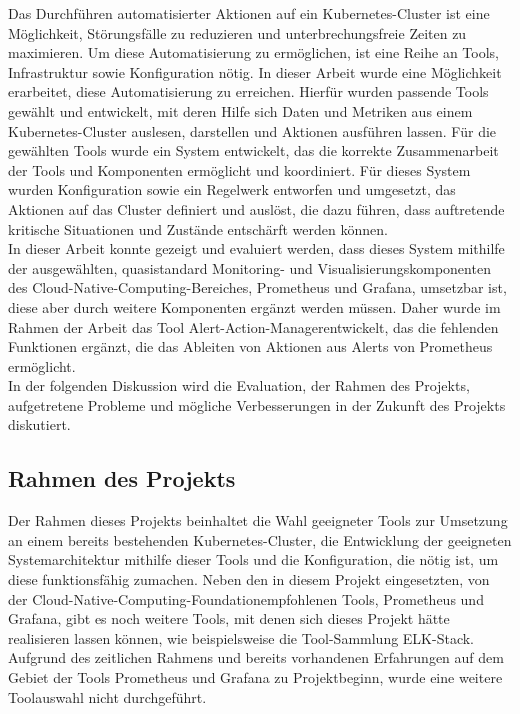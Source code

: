 \documentclass[a4paper,10pt]{scrartcl}
\begin{document}
Das Durchführen automatisierter Aktionen auf ein Kubernetes-Cluster ist eine Möglichkeit, Störungsfälle zu reduzieren und unterbrechungsfreie Zeiten zu maximieren. Um diese Automatisierung zu ermöglichen, ist eine Reihe an Tools, Infrastruktur sowie Konfiguration nötig. In dieser Arbeit wurde eine Möglichkeit erarbeitet, diese Automatisierung zu erreichen. Hierfür wurden passende Tools gewählt und entwickelt, mit deren Hilfe sich Daten und Metriken aus einem Kubernetes-Cluster auslesen, darstellen und Aktionen ausführen lassen. Für die gewählten Tools wurde ein System entwickelt, das die korrekte Zusammenarbeit der Tools und Komponenten ermöglicht und koordiniert. Für dieses System wurden Konfiguration sowie ein Regelwerk entworfen und umgesetzt, das Aktionen auf das Cluster definiert und auslöst, die dazu führen, dass auftretende kritische Situationen und Zustände entschärft werden können.\\
In dieser Arbeit konnte gezeigt und evaluiert werden, dass dieses System mithilfe der ausgewählten, quasistandard Monitoring- und Visualisierungskomponenten des \glqq Cloud-Native-Computing\grqq -Bereiches, Prometheus und Grafana, umsetzbar ist, diese aber durch weitere Komponenten ergänzt werden müssen. Daher wurde im Rahmen der Arbeit das Tool \glqq Alert-Action-Manager\grqq entwickelt, das die fehlenden Funktionen ergänzt, die das Ableiten von Aktionen aus Alerts von Prometheus ermöglicht. \\
In der folgenden Diskussion wird die Evaluation, der Rahmen des Projekts, aufgetretene Probleme und mögliche Verbesserungen in der Zukunft des Projekts diskutiert.

\subsection{Rahmen des Projekts}

Der Rahmen dieses Projekts beinhaltet die Wahl geeigneter Tools zur Umsetzung an einem bereits bestehenden Kubernetes-Cluster, die Entwicklung der geeigneten Systemarchitektur mithilfe dieser Tools und die Konfiguration, die nötig ist, um diese funktionsfähig zumachen.
Neben den in diesem Projekt eingesetzten, von der \glqq Cloud-Native-Computing-Foundation\grqq empfohlenen Tools, Prometheus und Grafana, gibt es noch weitere Tools, mit denen sich dieses Projekt hätte realisieren lassen können, wie beispielsweise die Tool-Sammlung \glqq ELK\grqq -Stack. Aufgrund des zeitlichen Rahmens und bereits vorhandenen Erfahrungen auf dem Gebiet der Tools Prometheus und Grafana zu Projektbeginn, wurde eine weitere Toolauswahl nicht durchgeführt.
\end{document}
